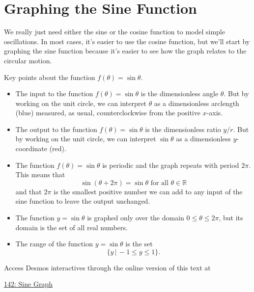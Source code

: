 \documentclass{ximera}
\begin{document}
\begin{onlineOnly}
    \begin{center}
\end{center}
\end{onlineOnly}


\section{Graphing the Sine Function}
We really just need either the sine or the cosine function to model simple oscillations. In most cases, it's easier to use the cosine function, but we'll start by graphing the sine function because it's easier to see how the graph relates to the circular motion.


\begin{exploration}  \label{Esdfsatnh4}

Key points about the function $f(\theta)=\sin\theta$.

\begin{itemize}

\item{The input to the function $f(\theta) = \sin\theta$ is the dimensionless angle $\theta$. But by working on the unit circle, we can interpret $\theta$ as a dimensionless arclength (blue) measured, as usual, counterclockwise from the positive $x$-axis.} 

\item{The output to the function $f(\theta) = \sin\theta$ is the dimensionless ratio $y/r$. But by working on the unit circle, we can interpret $\sin\theta$ as a dimensionless $y$-coordinate (red).}

\item{The function $f(\theta) = \sin\theta$ is periodic and the graph repeats with period $2\pi$. This means that 
\[
   \sin (\theta + 2\pi) = \sin \theta \text{ for all } \theta \in \mathbb{R}  
\]
and that $2\pi$ is the smallest positive number we can add to any input of the sine function to leave the output unchanged.}

\item{The function $y=\sin \theta$ is graphed only over the domain $0\leq \theta \leq 2\pi$, but its domain is the set of all real numbers.} 

\item{The range of the function $y=\sin\theta$ is the set
\[
     \{  y \, | \, -1\leq y \leq 1 \}.
\]}


\end{itemize}


Access Desmos interactives through the online version of this text at
 
\href{https://www.desmos.com/calculator/lurdcthxqu}{142: Sine Graph}

 
\begin{onlineOnly}
    \begin{center}
\end{center}
\end{onlineOnly}
\end{exploration}
\end{document}
